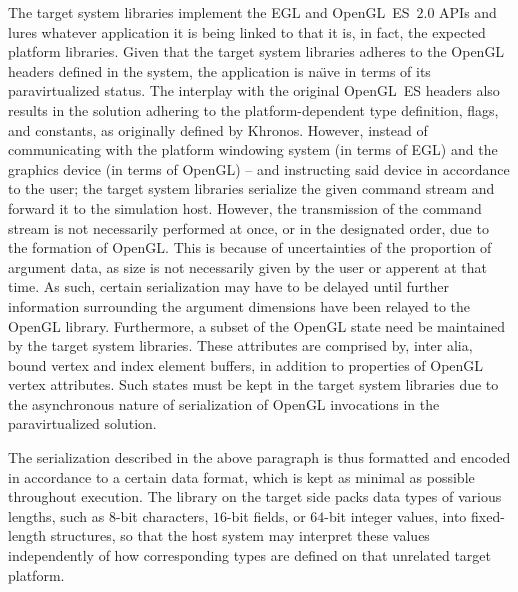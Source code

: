 The target system libraries implement the EGL and OpenGL~ES~$2.0$ APIs and lures whatever application it is being linked to that it is, in fact, the expected platform libraries.
Given that the target system libraries adheres to the OpenGL headers defined in the system, the application is na\"{\i}ve in terms of its paravirtualized status.
The interplay with the original OpenGL~ES headers also results in the solution adhering to the platform-dependent type definition, flags, and constants, as originally defined by Khronos.
However, instead of communicating with the platform windowing system (in terms of EGL) and the graphics device (in terms of OpenGL) -- and instructing said device in accordance to the user; the target system libraries serialize the given command stream and forward it to the simulation host.
However, the transmission of the command stream is not necessarily performed at once, or in the designated order, due to the formation of OpenGL.
This is because of uncertainties of the proportion of argument data, as size is not necessarily given by the user or apperent at that time.
As such, certain serialization may have to be delayed until further information surrounding the argument dimensions have been relayed to the OpenGL library.
Furthermore, a subset of the OpenGL state need be maintained by the target system libraries.
These attributes are comprised by, inter alia, bound vertex and index element buffers, in addition to properties of OpenGL vertex attributes.
Such states must be kept in the target system libraries due to the asynchronous nature of serialization of OpenGL invocations in the paravirtualized solution.

The serialization described in the above paragraph is thus formatted and encoded in accordance to a certain data format, which is kept as minimal as possible throughout execution.
The library on the target side packs data types of various lengths, such as $8$-bit characters, $16$-bit fields, or $64$-bit integer values, into fixed-length structures, so that the host system may interpret these values independently of how corresponding types are defined on that unrelated target platform.


